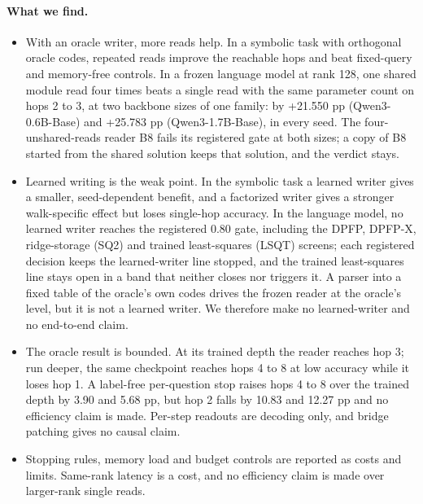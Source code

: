 \paragraph{What we find.}
\begin{itemize}[leftmargin=1.4em,itemsep=2pt,topsep=3pt]
\item With an oracle writer, more reads help.
In a symbolic task with orthogonal oracle codes, repeated reads improve the reachable hops and beat fixed-query and memory-free controls.  %
In a frozen language model at rank 128, one shared module read four times beats a single read with the same parameter count on hops 2 to 3, at two backbone sizes of one family: by +21.550 pp (Qwen3-0.6B-Base) and +25.783 pp (Qwen3-1.7B-Base), in every seed.  %
The four-unshared-reads reader B8 fails its registered gate at both sizes; a copy of B8 started from the shared solution keeps that solution, and the verdict stays.  %
\item Learned writing is the weak point.
In the symbolic task a learned writer gives a smaller, seed-dependent benefit, and a factorized writer gives a stronger walk-specific effect but loses single-hop accuracy.  %
In the language model, no learned writer reaches the registered 0.80 gate, including the DPFP, DPFP-X, ridge-storage (SQ2) and trained least-squares (LSQT) screens; each registered decision keeps the learned-writer line stopped, and the trained least-squares line stays open in a band that neither closes nor triggers it.  %
A parser into a fixed table of the oracle's own codes drives the frozen reader at the oracle's level, but it is not a learned writer.  %
We therefore make no learned-writer and no end-to-end claim.
\item The oracle result is bounded.
At its trained depth the reader reaches hop 3; run deeper, the same checkpoint reaches hops 4 to 8 at low accuracy while it loses hop 1.  %
A label-free per-question stop raises hops 4 to 8 over the trained depth by 3.90 and 5.68 pp, but hop 2 falls by 10.83 and 12.27 pp and no efficiency claim is made.  %
Per-step readouts are decoding only, and bridge patching gives no causal claim.  %
\item Stopping rules, memory load and budget controls are reported as costs and limits.
Same-rank latency is a cost, and no efficiency claim is made over larger-rank single reads.  %
\end{itemize}

